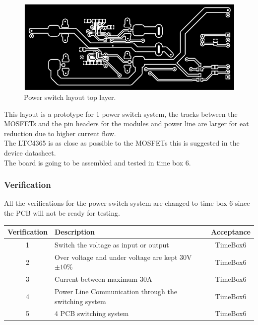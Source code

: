 \begin{figure}[H]
	\begin{centering}
		\includegraphics[width=1.0\textwidth]{images/tb5_layout_top.png}
		\caption{Power switch layout top layer.}
	\end{centering}
\end{figure}
%
This layout is a prototype for 1 power switch system, the tracks between the MOSFETs and the pin headers for the modules and power line are larger for eat reduction due to higher current flow.\\
The LTC4365 is as close as possible to the MOSFETs this is suggested in the device datasheet.\\
The board is going to be assembled and tested in time box 6.
%
\subsubsection{Verification}
All the verifications for the power switch system are changed to time box 6 since the PCB will not be ready for testing.
\begin{table}[H]
\centering
	\begin{tabular}{| c | l | c |}
		\hline
		Verification & Description & Acceptance \\\hline
		1 & Switch the voltage as input or output & TimeBox6 \\\hline
		2 & Over voltage and under voltage are kept 30V $ \pm10\% $ & TimeBox6 \\\hline
		3 & Current between maximum 30A & TimeBox6 \\\hline
		4 & Power Line Communication through the switching system & TimeBox6 \\\hline
		5 & 4 PCB switching system & TimeBox6 \\\hline
	\end{tabular}
\end{table}
%
%
